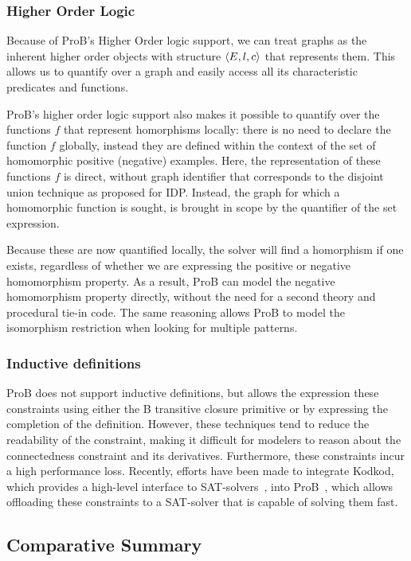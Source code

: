 \subsubsection{Higher Order Logic}
Because of ProB's Higher Order logic support, we can treat graphs as the inherent higher order objects with structure $\langle E,l,c \rangle$ that represents them.
This allows us to quantify over a graph and easily access all its characteristic predicates and functions.

ProB's higher order logic support also makes it possible to quantify over the functions $f$ that represent homorphisms locally: there is no need to declare the function $f$ globally, instead they are defined within the context of the set of homomorphic positive (negative) examples.
Here, the representation of these functions $f$ is direct, without graph identifier that corresponds to the disjoint union technique as proposed for IDP.
Instead, the graph  for which a homomorphic function is sought, is brought in scope by the quantifier of the set expression.

Because these are now quantified locally, the solver will find a homorphism if one exists, regardless of whether we are expressing the positive or negative homomorphism property.
As a result, ProB can model the negative homomorphism property directly, without the need for a second theory and procedural tie-in code.
The same reasoning allows ProB to model the isomorphism restriction when looking for multiple patterns.

\subsubsection{Inductive definitions}
ProB does not support inductive definitions, but allows the expression these constraints using either the B transitive closure primitive or by expressing the completion of the definition.
However, these techniques tend to reduce the readability of the constraint, making it difficult for modelers to reason about the connectedness constraint and its derivatives.
Furthermore, these constraints incur a high performance loss.
Recently, efforts have been made to integrate Kodkod, which provides a high-level interface to SAT-solvers~\citep{DBLP:conf/tacas/TorlakJ07}, into ProB~\citep{DBLP:conf/fm/PlaggeL12}, which allows offloading these constraints to a SAT-solver that is capable of solving them fast.


\subsection{Comparative Summary} %

